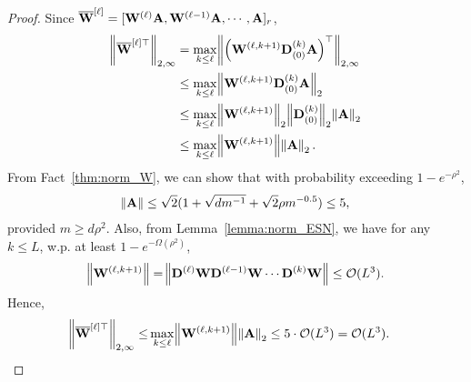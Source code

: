 \begin{proof}
	Since $\overline{\mathbf{W}}^{[\ell]} = [\mathbf{W}^{(\ell)} \mathbf{A}, \mathbf{W}^{(\ell-1)} \mathbf{A}, \cdots, \mathbf{A}]_r$,
	\begingroup \allowdisplaybreaks
	\begin{align*}
		\norm{\overline{\mathbf{W}}^{[\ell]\top}}_{2, \infty} &= \max_{k \le \ell} \norm{\left(\mathbf{W}^{(\ell, k+1)} \mathbf{D}_{(0)}^{(k)} \mathbf{A}\right)^{\top}}_{2, \infty} \\& \le 
		\max_{k \le \ell} \norm{\mathbf{W}^{(\ell, k+1)} \mathbf{D}_{(0)}^{(k)} \mathbf{A}}_{2}
		\\& \le \max_{k \le \ell} \norm{\mathbf{W}^{(\ell, k+1)}}_2 \norm{\mathbf{D}_{(0)}^{(k)}}_2 \norm{\mathbf{A}}_{2} \\& \le  \max_{k \le \ell} \norm{\mathbf{W}^{(\ell, k+1)}} \norm{\mathbf{A}}_{2}.
	\end{align*}
	\endgroup
	From Fact~\ref{thm:norm_W}, we can show that with probability exceeding $1 - e^{-\rho^2}$,
	\begin{align*}
		\norm{\mathbf{A}} \le  \sqrt{2}(1 + \sqrt{dm^{-1}} + \sqrt{2}\rho m^{-0.5}) \le 5,
	\end{align*}
	provided $m \ge d \rho^2$.
	Also, from Lemma~\ref{lemma:norm_ESN}, we have for any $k \le L$, w.p. at least $1-e^{-\Omega(\rho^2)}$,
	\begin{align*}
		\norm{\mathbf{W}^{(\ell, k+1)}} = \norm{\mathbf{D}^{(\ell)} \mathbf{W} \mathbf{D}^{(\ell-1)} \mathbf{W} \cdots \mathbf{D}^{(k)} \mathbf{W}} \le \mathcal{O}(L^3).
	\end{align*}
	Hence,
	\begin{align*}
		\norm{\overline{\mathbf{W}}^{[\ell]\top}}_{2, \infty} \le&\max_{k \le \ell} \norm{\mathbf{W}^{(\ell, k+1)}} \norm{\mathbf{A}}_{2} \le 5 \cdot \mathcal{O}(L^3) = \mathcal{O}(L^3).
	\end{align*}
\end{proof}



